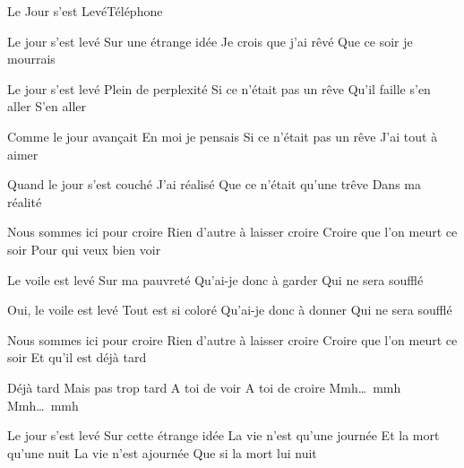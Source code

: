 \begin{Song}{Le Jour s'est Levé}{Téléphone}
\begin{multicols}{2}

\begin{Verse}
Le jour s'est levé
Sur une étrange idée
Je crois que j'ai rêvé
Que ce soir je mourrais
\espaceInterStrophe

Le jour s'est levé
Plein de perplexité
Si ce n'était pas un rêve
Qu'il faille s'en aller
S'en aller
\end{Verse}
\espaceInterStrophe

\espaceInterStrophe

\begin{Verse}
Comme le jour avançait
En moi je pensais
Si ce n'était pas un rêve
J'ai tout à aimer
\espaceInterStrophe

Quand le jour s'est couché
J'ai réalisé
Que ce n'était qu'une trêve
Dans ma réalité
\end{Verse}
\espaceInterStrophe

\begin{Chorus}
Nous sommes ici pour croire
Rien d'autre à laisser croire
Croire que l'on meurt ce soir
Pour qui veux bien voir
\end{Chorus}
\vfill
\columnbreak

\begin{Verse}
Le voile est levé
Sur ma pauvreté
Qu'ai-je donc à garder
Qui ne sera soufflé
\espaceInterStrophe

Oui, le voile est levé
Tout est si coloré
Qu'ai-je donc à donner
Qui ne sera soufflé
\end{Verse}
\espaceInterStrophe

\begin{Chorus}
Nous sommes ici pour croire
Rien d'autre à laisser croire
Croire que l'on meurt ce soir
Et qu'il est déjà tard
\end{Chorus}
\espaceInterStrophe

\begin{Bridge}
Déjà tard
Mais pas trop tard
A toi de voir
A toi de croire
Mmh\dots\ mmh
Mmh\dots\ mmh
\end{Bridge}
\espaceInterStrophe

\begin{Verse}
Le jour s'est levé
Sur cette étrange idée
La vie n'est qu'une journée
Et la mort qu'une nuit
La vie n'est ajournée
Que si la mort lui nuit
\end{Verse}
\end{multicols}


\end{Song}
